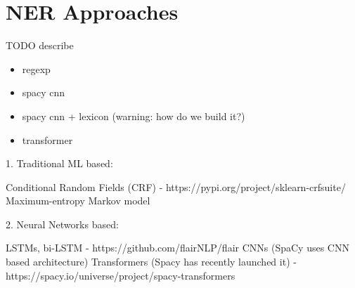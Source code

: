 \section{NER Approaches}

TODO describe
\begin{itemize}
    \item regexp
    \item spacy cnn
    \item spacy cnn + lexicon (warning: how do we build it?)
    \item transformer
\end{itemize}


1. Traditional ML based:

    Conditional Random Fields (CRF) - https://pypi.org/project/sklearn-crfsuite/
    Maximum-entropy Markov model

2. Neural Networks based:

    LSTMs, bi-LSTM - https://github.com/flairNLP/flair
    CNNs (SpaCy uses CNN based architecture)
    Transformers (Spacy has recently launched it) - https://spacy.io/universe/project/spacy-transformers